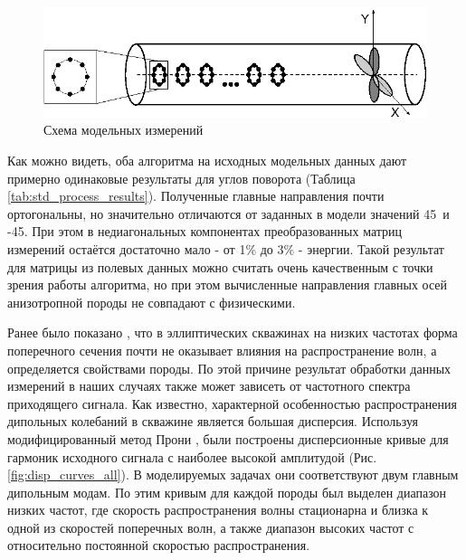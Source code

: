 \documentclass[a4paper,11pt]{article}
\begin{document}
\begin{figure}
\includegraphics[width=1\linewidth]{./images/logging_tool_scheme.eps}
\caption{Схема модельных измерений}
\label{fig:measurement_scheme}
\end{figure}

Как можно видеть, оба алгоритма на исходных модельных данных дают примерно одинаковые результаты для углов поворота (Таблица \ref{tab:std_process_results}). Полученные главные направления почти ортогональны, но значительно отличаются от заданных в модели значений 45\textdegree \ и -45\textdegree. При этом в недиагональных компонентах преобразованных матриц измерений остаётся достаточно мало - от 1\% до 3\% - энергии. Такой результат для матрицы из полевых данных можно считать очень качественным с точки зрения работы алгоритма, но при этом вычисленные направления главных осей анизотропной породы не совпадают с физическими.

Ранее было показано \cite{Seroices2010}, что в эллиптических скважинах на низких частотах форма поперечного сечения почти не оказывает влияния на распространение волн, а определяется свойствами породы. По этой причине результат обработки данных измерений в наших случаях также может зависеть от частотного спектра приходящего сигнала. Как известно, характерной особенностью распространения дипольных колебаний в скважине является большая дисперсия. Используя модифицированный метод Прони \cite{Ekstrom1995}, были построены дисперсионные кривые для гармоник исходного сигнала с наиболее высокой амплитудой (Рис. \ref{fig:disp_curves_all}). В моделируемых задачах они соответствуют двум главным дипольным модам. %
По этим кривым для каждой породы был выделен диапазон низких частот, где скорость распространения волны стационарна и близка к одной из скоростей поперечных волн, а также диапазон высоких частот с относительно постоянной скоростью распространения. 
\end{document}
